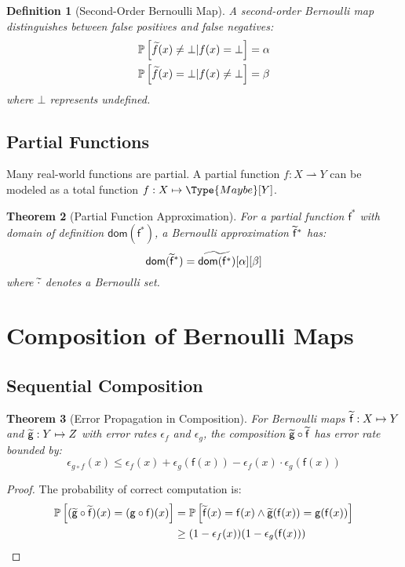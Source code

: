 \documentclass[11pt,final,hidelinks]{article}
\newtheorem{theorem}{Theorem}[section]
\newtheorem{definition}[theorem]{Definition}
\newcommand{\Fun}[1]{\mathsf{#1}}     %
\newcommand{\AFun}[1]{\obs{\mathsf{#1}}}  %
\newcommand{\PFun}[1]{\mathsf{#1}^*}      %
\newcommand{\APFun}[1]{\obs{\mathsf{#1}}^*}  %
\newcommand{\Set}[1]{#1}              %
\newcommand{\ASet}[1]{\obs{#1}}       %
\newcommand{\error}{\epsilon}
\newcommand{\Maybe}[1]{\Type{Maybe}[#1]}
\newcommand{\pfun}{\rightharpoonup}
\newcommand{\compose}{\circ}
\newcommand{\Dom}{\mathsf{dom}}
\begin{document}
\begin{definition}[Second-Order Bernoulli Map]
A second-order Bernoulli map distinguishes between false positives and false negatives:
\begin{align}
\mathbb{P}\left[\widetilde{f}(x) \neq \bot | f(x) = \bot\right] &= \alpha \\
\mathbb{P}\left[\widetilde{f}(x) = \bot | f(x) \neq \bot\right] &= \beta
\end{align}
where $\bot$ represents undefined.
\end{definition}

\subsection{Partial Functions}

Many real-world functions are partial. A partial function $f : X \pfun Y$ can be modeled as a total function $f : X \mapsto \Maybe{Y}$.

\begin{theorem}[Partial Function Approximation]
For a partial function $\PFun{f}$ with domain of definition $\Dom(\PFun{f})$, a Bernoulli approximation $\APFun{f}$ has:
\begin{equation}
\Dom(\APFun{f}) = \ASet{\Dom(\PFun{f})}[\fprate][\fnrate]
\end{equation}
where $\ASet{\cdot}$ denotes a Bernoulli set.
\end{theorem}

\section{Composition of Bernoulli Maps}

\subsection{Sequential Composition}

\begin{theorem}[Error Propagation in Composition]
For Bernoulli maps $\AFun{f} : \Set{X} \mapsto \Set{Y}$ and $\AFun{g} : \Set{Y} \mapsto \Set{Z}$ with error rates $\error_f$ and $\error_g$, the composition $\AFun{g} \compose \AFun{f}$ has error rate bounded by:
\begin{equation}
\error_{g \compose f}(x) \leq \error_f(x) + \error_g(\Fun{f}(x)) - \error_f(x) \cdot \error_g(\Fun{f}(x))
\end{equation}
\end{theorem}

\begin{proof}
The probability of correct computation is:
\begin{align}
\Prob{(\AFun{g} \compose \AFun{f})(x) = (\Fun{g} \compose \Fun{f})(x)} &= \Prob{\AFun{f}(x) = \Fun{f}(x) \land \AFun{g}(\Fun{f}(x)) = \Fun{g}(\Fun{f}(x))} \\
&\geq (1 - \error_f(x))(1 - \error_g(\Fun{f}(x)))
\end{align}
\end{proof}
\end{document}
